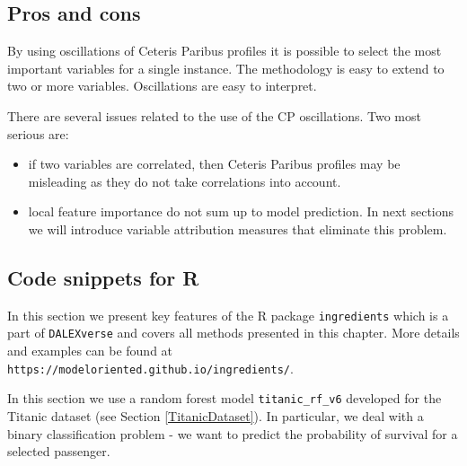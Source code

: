 \documentclass[12pt,]{krantz}
\providecommand{\tightlist}{%
  \setlength{\itemsep}{0pt}\setlength{\parskip}{0pt}}
\theoremstyle{definition}
\theoremstyle{definition}
\theoremstyle{definition}
\theoremstyle{remark}
\begin{document}
\hypertarget{pros-and-cons-1}{%
\subsection{Pros and cons}\label{pros-and-cons-1}}

By using oscillations of Ceteris Paribus profiles it is possible to
select the most important variables for a single instance. The
methodology is easy to extend to two or more variables. Oscillations are
easy to interpret.

There are several issues related to the use of the CP oscillations. Two
most serious are:

\begin{itemize}
\tightlist
\item
  if two variables are correlated, then Ceteris Paribus profiles may be
  misleading as they do not take correlations into account.
\item
  local feature importance do not sum up to model prediction. In next
  sections we will introduce variable attribution measures that
  eliminate this problem.
\end{itemize}

\hypertarget{code-snippets-for-r-1}{%
\subsection{Code snippets for R}\label{code-snippets-for-r-1}}

In this section we present key features of the R package
\texttt{ingredients} \citep{ingredientsRPackage} which is a part of
\texttt{DALEXverse} and covers all methods presented in this chapter.
More details and examples can be found at
\texttt{https://modeloriented.github.io/ingredients/}.

In this section we use a random forest \citep{R-randomForest} model
\texttt{titanic\_rf\_v6} developed for the Titanic dataset (see Section
\ref{TitanicDataset}). In particular, we deal with a binary
classification problem - we want to predict the probability of survival
for a selected passenger.
\end{document}
